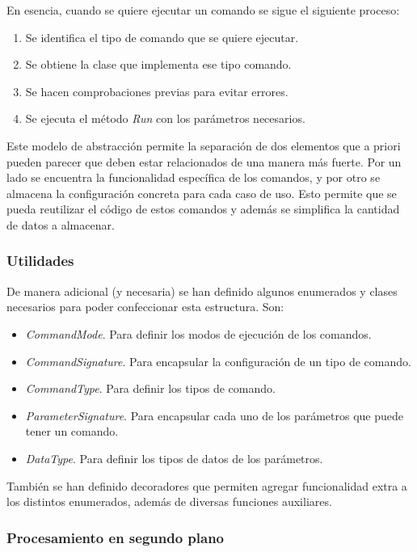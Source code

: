 En esencia, cuando se quiere ejecutar un comando se sigue el siguiente proceso:

\begin{enumerate}
	\item Se identifica el tipo de comando que se quiere ejecutar.
	\item Se obtiene la clase que implementa ese tipo comando.
	\item Se hacen comprobaciones previas para evitar errores.
	\item Se ejecuta el método \textit{Run} con los parámetros necesarios.
\end{enumerate}

Este modelo de abstracción permite la separación de dos elementos que a priori pueden parecer que deben estar relacionados de una manera más fuerte. Por un lado se encuentra la funcionalidad específica de los comandos, y por otro se almacena la configuración concreta para cada caso de uso. Esto permite que se pueda reutilizar el código de estos comandos y además se simplifica la cantidad de datos a almacenar.


\subsubsection{Utilidades}

De manera adicional (y necesaria) se han definido algunos enumerados y clases necesarios para poder confeccionar esta estructura. Son:

\begin{itemize}
	\item \textit{CommandMode}. Para definir los modos de ejecución de los comandos.
	\item \textit{CommandSignature}. Para encapsular la configuración de un tipo de comando.
	\item \textit{CommandType}. Para definir los tipos de comando.
	\item \textit{ParameterSignature}. Para encapsular cada uno de los parámetros que puede tener un comando.
	\item \textit{DataType}. Para definir los tipos de datos de los parámetros.
\end{itemize}

También se han definido decoradores que permiten agregar funcionalidad extra a los distintos enumerados, además de diversas funciones auxiliares.


\subsubsection{Procesamiento en segundo plano}

